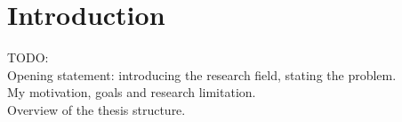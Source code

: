 \chapter*{Introduction}
TODO:\\

Opening statement: introducing the research field, stating the problem.\\
My motivation, goals and research limitation.\\
Overview of the thesis structure.\\